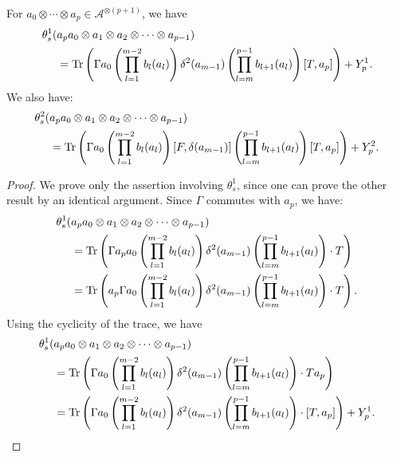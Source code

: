     \begin{lem}\label{kogom app 5}
        For $a_0\otimes \cdots\otimes a_p \in \mathcal{A}^{\otimes(p+1)}$, we have
        \begin{align*}
            \theta_s^1(&a_pa_0\otimes a_1\otimes a_2\otimes\cdots\otimes a_{p-1})\\
                     &= {\rm Tr}\left(\Gamma a_0\left(\prod_{l=1}^{m-2}b_l(a_l)\right)\delta^2(a_{m-1})\left(\prod_{l=m}^{p-1}b_{l+1}(a_l)\right)[T,a_p]\right)+Y^1_p.
        \end{align*}
        We also have:
        \begin{align*}
            \theta_s^2(&a_pa_0\otimes a_1\otimes a_2\otimes\cdots\otimes a_{p-1})\\
                       &={\rm Tr}\left(\Gamma a_0\left(\prod_{l=1}^{m-2}b_l(a_l)\right)[F,\delta(a_{m-1})]\left(\prod_{l=m}^{p-1}b_{l+1}(a_l)\right)[T,a_p]\right)+Y_p^2.
        \end{align*}
    \end{lem}
    \begin{proof} 
        We prove only the assertion involving $\theta_s^1$, since one can prove the other result by an identical argument.
        Since $\Gamma$ commutes with $a_p$, we have:
        \begin{align*}
            \theta_s^1(&a_pa_0\otimes a_1\otimes a_2\otimes\cdots\otimes a_{p-1})\\
                     &= {\rm Tr}\left(\Gamma a_pa_0\left(\prod_{l=1}^{m-2}b_l(a_l)\right)\delta^2(a_{m-1})\left(\prod_{l=m}^{p-1}b_{l+1}(a_l)\right)\cdot T\right)\\
                     &= {\rm Tr}\left(a_p\Gamma a_0\left(\prod_{l=1}^{m-2}b_l(a_l)\right)\delta^2(a_{m-1})\left(\prod_{l=m}^{p-1}b_{l+1}(a_l)\right)\cdot T\right).
        \end{align*}
        Using the cyclicity of the trace, we have
        \begin{align*}
            \theta_s^1(&a_pa_0\otimes a_1\otimes a_2\otimes\cdots\otimes a_{p-1})\\
                     &={\rm Tr}\left(\Gamma a_0\left(\prod_{l=1}^{m-2}b_l(a_l)\right)\delta^2(a_{m-1})\left(\prod_{l=m}^{p-1}b_{l+1}(a_l)\right)\cdot Ta_p\right)\\
                     &={\rm Tr}\left(\Gamma a_0\left(\prod_{l=1}^{m-2}b_l(a_l)\right)\delta^2(a_{m-1})\left(\prod_{l=m}^{p-1}b_{l+1}(a_l)\right)\cdot [T,a_p]\right)+Y_p^1.
        \end{align*}
    \end{proof}

